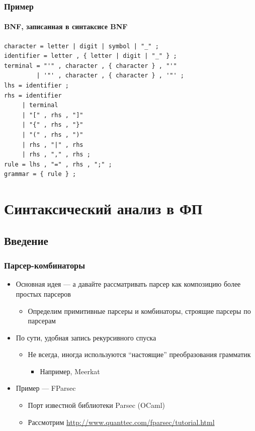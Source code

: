 \documentclass[xetex,mathserif,serif]{beamer}
\begin{document}
	\begin{frame}[fragile]
		\frametitle{Пример}
		\framesubtitle{BNF, записанная в синтаксисе BNF}
		\begin{footnotesize}
			\begin{verbatim}
character = letter | digit | symbol | "_" ;
identifier = letter , { letter | digit | "_" } ;
terminal = "'" , character , { character } , "'" 
         | '"' , character , { character } , '"' ;
lhs = identifier ;
rhs = identifier
     | terminal
     | "[" , rhs , "]"
     | "{" , rhs , "}"
     | "(" , rhs , ")"
     | rhs , "|" , rhs
     | rhs , "," , rhs ;
rule = lhs , "=" , rhs , ";" ;
grammar = { rule } ;
			\end{verbatim}
		\end{footnotesize}
	\end{frame}

	\section{Синтаксический анализ в ФП}

	\subsection{Введение}

	\begin{frame}
		\frametitle{Парсер-комбинаторы}
		\begin{itemize}
			\item Основная идея --- а давайте рассматривать парсер как композицию более простых парсеров
			\begin{itemize}
				\item Определим примитивные парсеры и комбинаторы, строящие парсеры по парсерам
			\end{itemize}
			\item По сути, удобная запись рекурсивного спуска
			\begin{itemize}
				\item Не всегда, иногда используются ``настоящие'' преобразования грамматик
				\begin{itemize}
					\item Например, Meerkat
				\end{itemize}
			\end{itemize}
			\item Пример --- FParsec
			\begin{itemize}
				\item Порт известной библиотеки Parsec (OCaml)
				\item Рассмотрим \url{http://www.quanttec.com/fparsec/tutorial.html}
			\end{itemize}
		\end{itemize}
	\end{frame}
\end{document}
